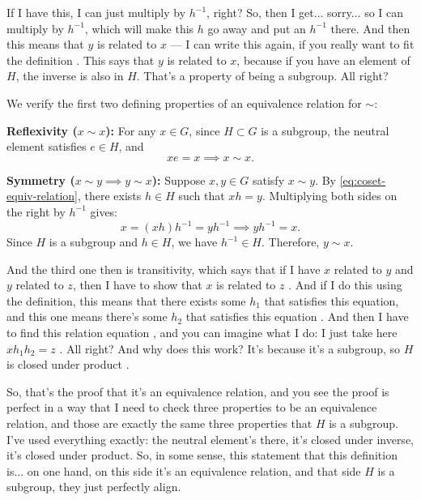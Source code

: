 \begin{proofWrapper}
\begin{speech}[00:16:17 - 00:17:27]
If I have this, I can just multiply by $h^{-1}$, right? So, then I get... sorry...  so I can multiply by $h^{-1}$, which will make this $h$ go away and put an $h^{-1}$ there. And then this means that $y$ is related to $x$ --- I can write this again, if you really want to fit the definition . This says that $y$ is related to $x$, because if you have an element of $H$, the inverse is also in $H$. That's a property of being a subgroup. All right?
\end{speech}

\begin{content}
We verify the first two defining properties of an equivalence relation for $\sim$:

\textbf{Reflexivity ($x \sim x$):} For any $x \in G$, since $H \subset G$ is a subgroup, the neutral element satisfies $e \in H$, and
\[
x e = x \implies x \sim x.
\]

\textbf{Symmetry ($x \sim y \implies y \sim x$):} Suppose $x, y \in G$ satisfy $x \sim y$. By \eqref{eq:coset-equiv-relation}, there exists $h \in H$ such that $xh = y$. Multiplying both sides on the right by $h^{-1}$ gives:
\[
x = (xh)h^{-1} = y h^{-1} \implies y h^{-1} = x.
\]
Since $H$ is a subgroup and $h \in H$, we have $h^{-1} \in H$. Therefore, $y \sim x$.
\end{content}

\begin{speech}[00:17:27 - 00:18:54]
And the third one then is transitivity, which says that if I have $x$ related to $y$ and $y$ related to $z$, then I have to show that $x$ is related to $z$ . And if I do this using the definition, this means that there exists some $h_1$ that satisfies this equation, and this one means there's some $h_2$ that satisfies this equation . And then I have to find this relation equation , and you can imagine what I do: I just take here $x h_1 h_2 = z$ . All right? And why does this work? It's because it's a subgroup, so $H$ is closed under product .

So, that's the proof that it's an equivalence relation, and you see the proof is perfect in a way that I need to check three properties to be an equivalence relation, and those are exactly the same three properties that $H$ is a subgroup. I've used everything exactly: the neutral element's there, it's closed under inverse, it's closed under product. So, in some sense, this statement that this definition is... on one hand, on this side it's an equivalence relation, and that side $H$ is a subgroup, they just perfectly align.
\end{speech}


\end{proofWrapper}
